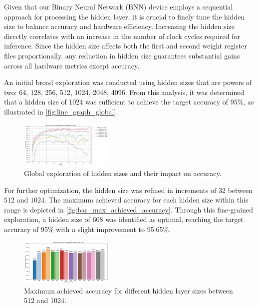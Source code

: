 \documentclass[conference]{IEEEtran}
\begin{document}
Given that our Binary Neural Network (BNN) device employs a sequential approach for processing the hidden layer, it is crucial to finely tune the hidden size to balance accuracy and hardware efficiency. Increasing the hidden size directly correlates with an increase in the number of clock cycles required for inference.
Since the hidden size affects both the first and second weight register files proportionally, any reduction in hidden size guarantees substantial gains across all hardware metrics except accuracy.

An initial broad exploration was conducted using hidden sizes that are powers of two: 64, 128, 256, 512, 1024, 2048, 4096. From this analysis, it was determined that a hidden size of 1024 was sufficient to achieve the target accuracy of 95\%, as illustrated in \autoref{fig:line_graph_global}.

\begin{figure}[h]
    \centering
    \includegraphics[width=0.4\textwidth]{Global_exploration_hidden_sizes.png}
    \caption{Global exploration of hidden sizes and their impact on accuracy.}
    \label{fig:line_graph_global}
\end{figure}

For further optimization, the hidden size was refined in increments of 32 between 512 and 1024. The maximum achieved accuracy for each hidden size within this range is depicted in \autoref{fig:bar_max_achieved_accuracy}. Through this fine-grained exploration, a hidden size of 608 was identified as optimal, reaching the target accuracy of 95\% with a slight improvement to 95.65\%.

\begin{figure}[h]
    \centering
    \includegraphics[width=0.4\textwidth]{Different_hidden_layer_sizes_512_1024.png}
    \caption{Maximum achieved accuracy for different hidden layer sizes between 512 and 1024.}
    \label{fig:bar_max_achieved_accuracy}
\end{figure}
\end{document}
